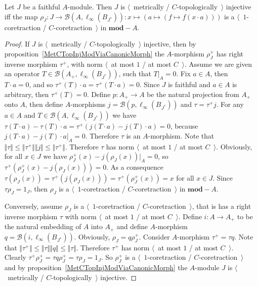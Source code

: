 \begin{proposition}\label{NonDegenMetTopInjCharac}  Let $J$ be a faithful
$A$-module. Then $J$ is $\langle$~metrically / $C$-topologically~$\rangle$
injective iff the map
$\rho_J:J\to\mathcal{B}(A,\ell_\infty(B_{J^*})):x\mapsto(a\mapsto(f\mapsto
f(x\cdot a)))$ is a $\langle$~$1$-coretraction / $C$-coretraction~$\rangle$ in
$\mathbf{mod}-A$.
\end{proposition} 
\begin{proof}
If $J$ is $\langle$~metrically / $C$-topologically~$\rangle$ injective, then by
proposition~\ref{MetCTopInjModViaCanonicMorph} the $A$-morphism $\rho_J^+$ has
right inverse morphism $\tau^+$, with norm $\langle$~at most $1$ / at most
$C$~$\rangle$. Assume we are given an operator $T\in
\mathcal{B}(A_+,\ell_\infty(B_{J^*}))$, such that $T|_A=0$. Fix $a\in A$, then
$T\cdot a=0$, and so $\tau^+(T)\cdot a=\tau^+(T\cdot a)=0$. Since $J$ is
faithful and $a\in A$ is arbitrary, then $\tau^+(T)=0$. Define $p:A_+\to A$ be
the natural projection from $A_+$ onto $A$, then define $A$-morphisms
$j=\mathcal{B}(p,\ell_\infty(B_{J^*}))$ and $\tau =\tau^+ j$. For any $a\in A$
and $T\in\mathcal{B}(A,\ell_\infty(B_{J^*}))$ 
we have $\tau (T\cdot a)-\tau (T)\cdot a=\tau^+(j(T\cdot a)-j(T)\cdot a)=0$, 
because $j(T\cdot a)-j(T)\cdot a|_A=0$. Therefore $\tau $ is an $A$-morphism. 
Note that $\Vert\tau \Vert\leq\Vert\tau^+\Vert\Vert j\Vert\leq\Vert\tau^+\Vert$.
Therefore $\tau$ has norm $\langle$~at most $1$ / at most $C$~$\rangle$. 
Obviously, for all $x\in J$ we have $\rho_J^+(x)-j(\rho_J(x))|_A=0$, 
so $\tau^+(\rho_J^+(x)-j(\rho_J(x)))=0$. 
As a consequence $\tau (\rho_J(x))=\tau^+(j(\rho_J(x)))=\tau^+(\rho_J^+(x))=x$ 
for all $x\in J$. Since $\tau \rho_J=1_J$, then $\rho_J$ 
is a  $\langle$~$1$-coretraction / $C$-coretraction~$\rangle$ 
in $\mathbf{mod}-A$.

Conversely, assume $\rho_J$ is a $\langle$~$1$-coretraction /
$C$-coretraction~$\rangle$, that is has a right inverse morphism $\tau $ with
norm $\langle$~at most $1$ / at most $C$~$\rangle$. Define $i:A\to A_+$ to be
the natural embedding of $A$ into $A_+$ and define $A$-morphism
$q=\mathcal{B}(i,\ell_\infty(B_{J^*}))$. Obviously, $\rho_J=q\rho_J^+$. Consider
$A$-morphism $\tau^+=\tau q$. 
Note that $\Vert\tau^+\Vert\leq\Vert\tau \Vert\Vert q\Vert\leq \Vert\tau \Vert$.
Therefore $\tau^+$ has norm $\langle$~at most $1$ / at most $C$~$\rangle$. 
Clearly $\tau^+\rho_J^+=\tau q\rho_J^+=\tau \rho_J=1_J$. So $\rho_J^+$ 
is a $\langle$~$1$-coretraction / $C$-coretraction~$\rangle$ and by 
proposition~\ref{MetCTopInjModViaCanonicMorph} the $A$-module $J$ is
$\langle$~metrically / $C$-topologically~$\rangle$ injective.
\end{proof}

